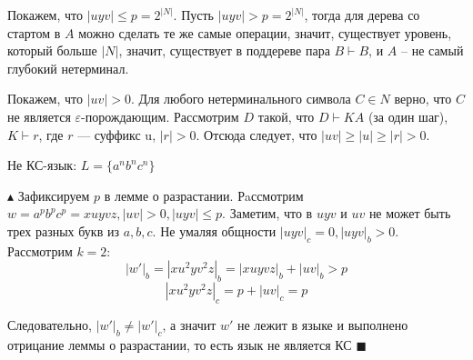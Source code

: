 Покажем, что $|uyv| \leq p = 2^{|N|}$. Пусть $|uyv| > p = 2^{|N|}$, тогда для дерева со стартом в $A$ можно сделать те же самые операции, значит, существует уровень, который больше $|N|$, значит, существует в поддереве пара $B \vdash B$, и $A$ -- не самый глубокий нетерминал.

Покажем, что $|uv| > 0$. Для любого нетерминального символа $C \in N$ верно, что $C$ не является $\varepsilon$-порождающим. Рассмотрим $D$ такой, что $D \vdash KA$ (за один шаг), $K \vdash r$, где $r$ — суффикс u, $|r| > 0$. Отсюда следует, что $|uv| \geq |u| \geq |r| > 0$. \EndProof

\par \Example Не КС-язык: $L=\{a^n b^n c^n\}$
\par $\blacktriangle$ Зафиксируем $p$ в лемме о разрастании. Рaссмотрим $w=a^p b^p c^p=xuyvz, |uv|>0, |uyv|\leq p$. Заметим, что в $uyv$ и $uv$ не может быть трех разных букв из $a,b,c$. Не умаляя общности $|uyv|_c=0, |uyv|_b>0$. Рассмотрим $k=2$: $$|w'|_b=|xu^2yv^2z|_b=|xuyvz|_b+|uv|_b>p$$ $$|xu^2yv^2z|_c=p+|uv|_c=p$$
\par Следовательно, $|w'|_b \neq |w'|_c$, а значит $w'$ не лежит в языке и выполнено отрицание леммы о разрастании, то есть язык не является КС $\blacksquare$
